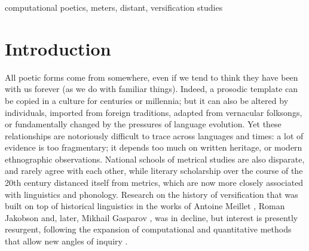 \documentclass[
    hf
]{ceurart}
\begin{document}
\begin{keywords}
    computational poetics, meters, distant, versification studies
\end{keywords}

\maketitle

\section{Introduction}

All poetic forms come from somewhere, even if we tend to think they have been with us forever (as we do with familiar things). Indeed, a prosodic template can be copied in a culture for centuries or millennia; but it can also be altered by individuals, imported from foreign traditions, adapted from vernacular folksongs, or fundamentally changed by the pressures of language evolution. Yet these relationships are notoriously difficult to trace across languages and times: a lot of evidence is too fragmentary; it depends too much on written heritage, or modern ethnographic observations. National schools of metrical studies are also disparate, and rarely agree with each other, while literary scholarship over the course of the 20th century distanced itself from metrics, which are now more closely associated with linguistics and phonology. Research on the history of versification that was built on top of historical linguistics in the works of Antoine Meillet \cite{meillet_origines_1923}, Roman Jakobson \cite{jakobson_zur_1929} and, later, Mikhail Gasparov \cite{gasparov_history_1996}, was in decline, but interest is presently resurgent, following the expansion of computational and quantitative methods that allow new angles of inquiry \cite{polilova_spanish_2018, sela_semantics_2022,de_sisto_development_2023}.
\end{document}
